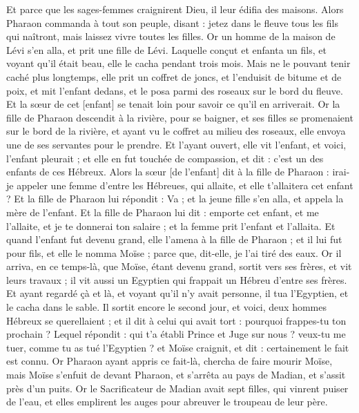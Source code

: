 \begin{multicols}{2}
Et parce que les sages-femmes craignirent Dieu, il leur édifia des maisons.
Alors Pharaon commanda à tout son peuple, disant : jetez dans le fleuve tous les fils qui naîtront, mais laissez vivre toutes les filles.
\VerseOne{}Or un homme de la maison de Lévi s'en alla, et prit une fille de Lévi.
Laquelle conçut et enfanta un fils, et voyant qu'il était beau, elle le cacha pendant trois mois.
Mais ne le pouvant tenir caché plus longtemps, elle prit un coffret de joncs, et l'enduisit de bitume et de poix, et mit l'enfant dedans, et le posa parmi des roseaux sur le bord du fleuve.
Et la sœur de cet [enfant] se tenait loin pour savoir ce qu'il en arriverait.
Or la fille de Pharaon descendit à la rivière, pour se baigner, et ses filles se promenaient sur le bord de la rivière, et ayant vu le coffret au milieu des roseaux, elle envoya une de ses servantes pour le prendre.
Et l'ayant ouvert, elle vit l'enfant, et voici, l'enfant pleurait ; et elle en fut touchée de compassion, et dit : c'est un des enfants de ces Hébreux.
Alors la sœur [de l'enfant] dit à la fille de Pharaon : irai-je appeler une femme d'entre les Hébreues, qui allaite, et elle t'allaitera cet enfant ?
Et la fille de Pharaon lui répondit : Va ; et la jeune fille s'en alla, et appela la mère de l'enfant.
Et la fille de Pharaon lui dit : emporte cet enfant, et me l'allaite, et je te donnerai ton salaire ; et la femme prit l'enfant et l'allaita.
Et quand l'enfant fut devenu grand, elle l'amena à la fille de Pharaon ; et il lui fut pour fils, et elle le nomma Moïse ; parce que, dit-elle, je l'ai tiré des eaux.
Or il arriva, en ce temps-là, que Moïse, étant devenu grand, sortit vers ses frères, et vit leurs travaux ; il vit aussi un Egyptien qui frappait un Hébreu d'entre ses frères.
Et ayant regardé çà et là, et voyant qu'il n'y avait personne, il tua l'Egyptien, et le cacha dans le sable.
Il sortit encore le second jour, et voici, deux hommes Hébreux se querellaient ; et il dit à celui qui avait tort : pourquoi frappes-tu ton prochain ?
Lequel répondit : qui t'a établi Prince et Juge sur nous ? veux-tu me tuer, comme tu as tué l'Egyptien ? et Moïse craignit, et dit : certainement le fait est connu.
Or Pharaon ayant appris ce fait-là, chercha de faire mourir Moïse, mais Moïse s'enfuit de devant Pharaon, et s'arrêta au pays de Madian, et s'assit près d'un puits.
Or le Sacrificateur de Madian avait sept filles, qui vinrent puiser de l'eau, et elles emplirent les auges pour abreuver le troupeau de leur père.

\end{multicols}

